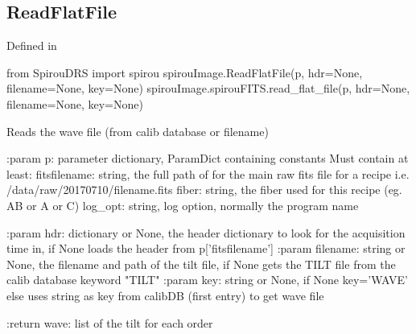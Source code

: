 
\begin{minipage}{\textwidth}
\subsection{ReadFlatFile}

Defined in \spirouImage{}

\begin{pythonbox}
from SpirouDRS import spirou
spirouImage.ReadFlatFile(p, hdr=None, filename=None, key=None)
spirouImage.spirouFITS.read_flat_file(p, hdr=None, filename=None, key=None)
\end{pythonbox}

\begin{pythondocstring}
Reads the wave file (from calib database or filename)

:param p: parameter dictionary, ParamDict containing constants
    Must contain at least:
            fitsfilename: string, the full path of for the main raw fits
                          file for a recipe
                          i.e. /data/raw/20170710/filename.fits
            fiber: string, the fiber used for this recipe (eg. AB or A or C)
            log_opt: string, log option, normally the program name

:param hdr: dictionary or None, the header dictionary to look for the
                 acquisition time in, if None loads the header from
                 p['fitsfilename']
:param filename: string or None, the filename and path of the tilt file,
                 if None gets the TILT file from the calib database
                 keyword "TILT"
:param key: string or None, if None key='WAVE' else uses string as key
            from calibDB (first entry) to get wave file

:return wave: list of the tilt for each order
\end{pythondocstring}
\end{minipage}


